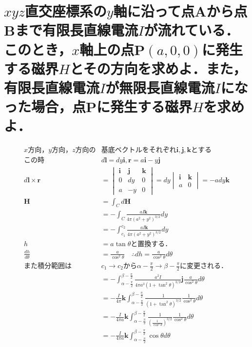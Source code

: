 \documentclass[dvipdfmx]{ujarticle}
\begin{document}
\section{$xyz$直交座標系の$y$軸に沿って点Aから点Bまで有限長直線電流$I$が流れている．このとき，$x$軸上の点P$(a, 0, 0)$に発生する磁界$H$とその方向を求めよ．また，有限長直線電流$I$が無限長直線電流$I$になった場合，点Pに発生する磁界$H$を求めよ．}
\begin{align*}
	x方向，y方向，z方向の&基底ベクトルをそれぞれ\boldsymbol{i},\boldsymbol{j},\boldsymbol{k}とする\\
	この時&d\boldsymbol{l}=dy\boldsymbol{i}, \boldsymbol{r}=a\boldsymbol{i}-y\boldsymbol{j}\\
	d\boldsymbol{l}\times \boldsymbol{r}&=
	\begin{vmatrix}
	\boldsymbol{i} & \boldsymbol{j} & \boldsymbol{k}\\
	0 &dy & 0\\
	a & -y &0
	\end{vmatrix}
	=dy
	\begin{vmatrix}
	\boldsymbol{i}  & \boldsymbol{k}\\
	a & 0
	\end{vmatrix}
	=-ady\boldsymbol{k}\\
	\boldsymbol{H}&=\int_{C} d\boldsymbol{H}\\
	&=-\int_{C} \frac{aI\boldsymbol{k}}{4\pi(a^{2}+y^{2})^{3/2}}dy\\
	&=-\int_{c_{1}}^{c_{2}} \frac{aI\boldsymbol{k}}{4\pi(a^{2}+y^{2})^{3/2}}dy\\
	h&=a\tan \theta と置換する．\\
	\frac{dh}{d\theta}&=\frac{a}{\cos ^{2}\theta } \quad \therefore dh=\frac{a}{\cos ^{2}\theta }d\theta \\
	また積分範囲は&c_{1}\to c_{2}から\alpha-\frac{\pi}{2} \to \beta -\frac{\pi}{2}に変更される．\\
	&=-\int_{\alpha-\frac{\pi}{2}}^{\beta -\frac{\pi}{2}} \frac{a^{2}I}{4\pi a^{3}(1+\tan^{2}\theta)^{3/2}}\boldsymbol{j} \frac{a}{\cos ^{2}\theta }d\theta\\
	&=-\frac{I}{4\pi} \boldsymbol{k} \int_{\alpha-\frac{\pi}{2}}^{\beta -\frac{\pi}{2}} \frac{1}{(1+\tan^{2}\theta)^{3/2}} \frac{1}{\cos ^{2}\theta }d\theta\\
	&=-\frac{I}{4\pi a} \boldsymbol{k} \int_{\alpha-\frac{\pi}{2}}^{\beta -\frac{\pi}{2}} \frac{1}{(\frac{1}{\cos^{2} \theta })^{3/2}} \frac{1}{\cos ^{2}\theta }d\theta\\
	&=-\frac{I}{4\pi a}  \boldsymbol{k}\int_{\alpha-\frac{\pi}{2}}^{\beta -\frac{\pi}{2}} \cos \theta d \theta \\\

\end{align*}
\end{document}
